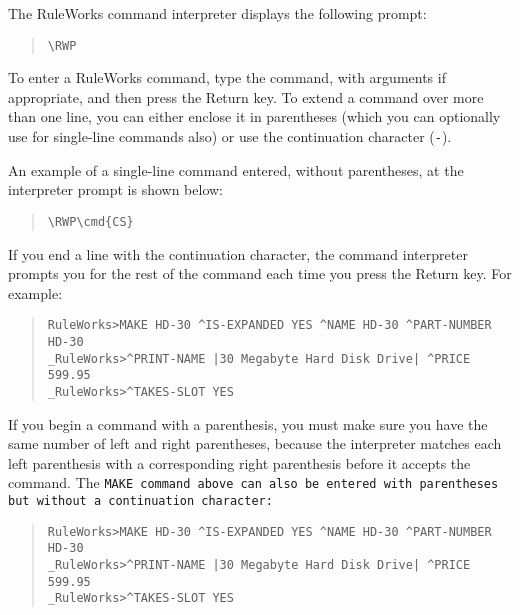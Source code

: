 The RuleWorks command interpreter displays the following prompt:

\begin{quote}
\begin{Verbatim}[commandchars=\\\{\}]
\RWP
\end{Verbatim}
\end{quote}

To enter a RuleWorks command, type the command, with arguments if
appropriate, and then press the Return key. To extend a command over
more than one line, you can either enclose it in parentheses (which
you can optionally use for single-line commands also) or use the
continuation character (\verb|-|).

An example of a single-line command entered, without parentheses, at
the interpreter prompt is shown below:

\begin{quote}
\begin{Verbatim}[commandchars=\\\{\}]
\RWP\cmd{CS}
\end{Verbatim}
\end{quote}

If you end a line with the continuation character, the command
interpreter prompts you for the rest of the command each time you
press the Return key. For example:

\begin{quote}
\begin{verbatim}
RuleWorks>MAKE HD-30 ^IS-EXPANDED YES ^NAME HD-30 ^PART-NUMBER HD-30
_RuleWorks>^PRINT-NAME |30 Megabyte Hard Disk Drive| ^PRICE 599.95
_RuleWorks>^TAKES-SLOT YES
\end{verbatim}
\end{quote}

If you begin a command with a parenthesis, you must make sure you have
the same number of left and right parentheses, because the interpreter
matches each left parenthesis with a corresponding right parenthesis
before it accepts the command.  The \tt{MAKE} command above can also
be entered with parentheses but without a continuation character:

\begin{quote}
\begin{verbatim}
RuleWorks>MAKE HD-30 ^IS-EXPANDED YES ^NAME HD-30 ^PART-NUMBER HD-30
_RuleWorks>^PRINT-NAME |30 Megabyte Hard Disk Drive| ^PRICE 599.95
_RuleWorks>^TAKES-SLOT YES
\end{verbatim}
\end{quote}

